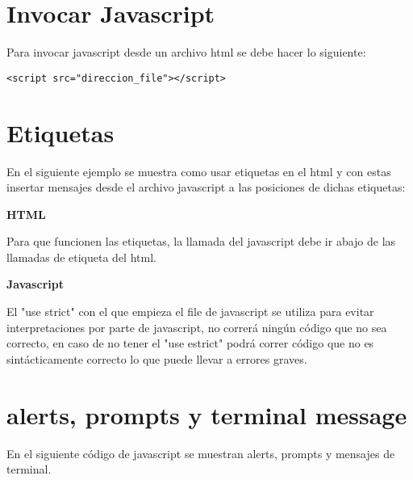 \section{Invocar Javascript}

Para invocar javascript desde un archivo html se debe hacer lo siguiente:

\begin{lstlisting}[numbers=none]
  <script src="direccion_file"></script>
\end{lstlisting}

\section{Etiquetas}

En el siguiente ejemplo se muestra como usar etiquetas en el html y con estas insertar mensajes desde el archivo javascript a las posiciones de dichas etiquetas:

\textbf{HTML}


Para que funcionen las etiquetas, la llamada del javascript debe ir abajo de las llamadas de etiqueta del html.

\textbf{Javascript}



El "use strict" con el que empieza el file de javascript se utiliza para evitar interpretaciones por parte de javascript, no correr\'a ning\'un c\'odigo que no sea correcto, en caso de no tener el "use estrict" podr\'a correr c\'odigo que no es sint\'acticamente correcto lo que puede llevar a errores graves.

\section{alerts, prompts y terminal message}

En el siguiente c\'odigo de javascript se muestran alerts, prompts y mensajes de terminal.




